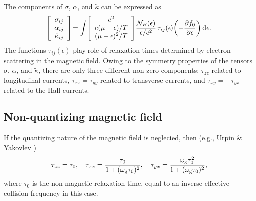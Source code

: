 \documentclass{aa}
\newcommand{\beq}{\begin{equation}}
\newcommand{\eeq}{\end{equation}}
\newcommand{\omg}{\omega_{\rm g}}
\newcommand{\Ne}{{\cal N}_B(\epsilon)}
\newcommand{\dfde}{{\partial f_0 \over\partial\epsilon}}
\begin{document}
The components of $\sigma$, $\alpha$, and $\tilde\kappa$ can be expressed as
\beq
\!\left[
   \begin{array}{c}
       \sigma_{ij} \\ \alpha_{ij} \\ \tilde\kappa_{ij}
   \end{array}
   \right]\!
  =
     \int \!\left[
   \begin{array}{c}
       e^2 \\ e {(\mu - \epsilon)/ T} \\ {(\mu - \epsilon)^2/ T}
   \end{array}
   \right]\!
   {\Ne\over\epsilon/c^2} \,\tau_{ij}(\epsilon)
   \!\left( -\dfde \right)
      {\rm d}\epsilon.
\label{sigma-tau}
\eeq
The functions $\tau_{ij}(\epsilon)$
play role of relaxation times
determined by electron scattering
in the magnetic field.
Owing to the symmetry properties of
the tensors $\sigma$, $\alpha$, and $\tilde\kappa$,
there are only three different
non-zero components:
$\tau_{zz}$ related to longitudinal currents,
$\tau_{xx}=\tau_{yy}$ related to transverse currents,
and $\tau_{xy}=-\tau_{yx}$ related to the Hall currents.

\subsection{Non-quantizing magnetic field}
%
If the quantizing nature of the magnetic field is neglected, then
(e.g., Urpin \& Yakovlev \cite{uy80'})
\beq
   \tau_{zz}=\tau_0,
\quad
   \tau_{xx}={\tau_0\over 1+(\omg\tau_0)^2},
\quad
   \tau_{yx}={\omg\tau_0^2\over 1+(\omg\tau_0)^2},
\label{tau-non-quant}
\eeq
where $\tau_0$ is the non-magnetic relaxation time,
equal to an inverse effective collision frequency
in this case.
\end{document}

